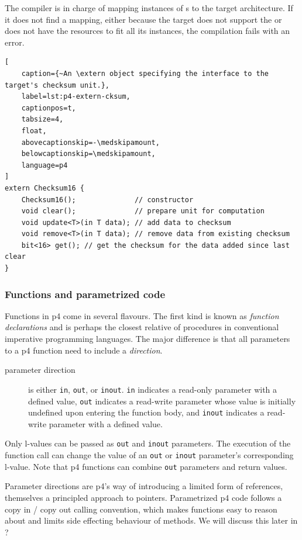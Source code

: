 The compiler is in charge of mapping instances of \extern{}s to the target
architecture. If it does not find a mapping, either because the target does not
support the \extern or does not have the resources to fit all its instances, the
compilation fails with an error.

\begin{lstlisting}[
	caption={~An \extern object specifying the interface to the target's checksum unit.},
	label=lst:p4-extern-cksum,
	captionpos=t,
	tabsize=4,
	float,
	abovecaptionskip=-\medskipamount,
	belowcaptionskip=\medskipamount,
	language=p4
]
extern Checksum16 {
	Checksum16();              // constructor
	void clear();              // prepare unit for computation
	void update<T>(in T data); // add data to checksum
	void remove<T>(in T data); // remove data from existing checksum
	bit<16> get(); // get the checksum for the data added since last clear
}
\end{lstlisting}

\subsubsection*{Functions and parametrized code}

Functions in \acrshort{p4} come in several flavours. The first kind is known as
\emph{function declarations} and is perhaps the closest relative of procedures
in conventional imperative programming languages. The major difference is that
all parameters to a \acrshort{p4} function need to include a \emph{direction}.

\begin{description}
	\item[parameter direction] is either \texttt{in}, \texttt{out}, or
	\texttt{inout}. \texttt{in} indicates a read-only parameter with a defined
	value, \texttt{out} indicates a read-write parameter whose value is
	initially undefined upon entering the function body, and \texttt{inout}
	indicates a read-write parameter with a defined value.
\end{description}

Only l-values can be passed as \texttt{out} and
\texttt{inout} parameters. The execution of the function call can change the
value of an \texttt{out} or \texttt{inout} parameter's corresponding l-value.
Note that \acrshort{p4} functions can combine \texttt{out} parameters and return
values.

Parameter directions are \acrshort{p4}'s way of introducing a limited form of
references, themselves a principled approach to pointers. Parametrized
\acrshort{p4} code follows a copy in / copy out calling convention, which makes
functions easy to reason about and limits side effecting behaviour of \extern
methods. We will discuss this later in ?

